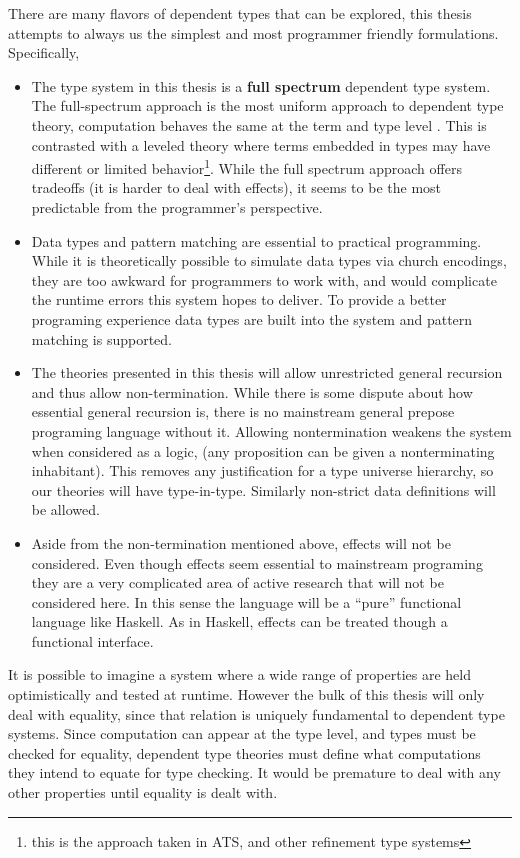 There are many flavors of dependent types that can be explored, this
thesis attempts to always us the simplest and most programmer friendly
formulations. Specifically, 
\begin{itemize}
\item The type system in this thesis is a \textbf{full spectrum} dependent
type system. The full-spectrum approach is the most uniform approach
to dependent type theory, computation behaves the same at the term
and type level \cite{10.1145/289423.289451,norell2007towards,brady2013idris,sjoberg2012irrelevance}.
This is contrasted with a leveled theory where terms embedded in types
may have different or limited behavior\footnote{this is the approach taken in ATS, and other refinement type systems}.
While the full spectrum approach offers tradeoffs (it is harder to
deal with effects), it seems to be the most predictable from the programmer's
perspective.
\item Data types and pattern matching are essential to practical programming.
While it is theoretically possible to simulate data types via church
encodings, they are too awkward for programmers to work with, and
would complicate the runtime errors this system hopes to deliver.
To provide a better programing experience data types are built into
the system and pattern matching is supported.
\item The theories presented in this thesis will allow unrestricted general
recursion and thus allow non-termination. While there is some dispute
about how essential general recursion is, there is no mainstream general prepose programing language without
it. Allowing nontermination weakens the system when considered as
a logic, (any proposition can be given a nonterminating inhabitant).
This removes any justification for a type universe hierarchy, so our
theories will have type-in-type. Similarly non-strict data definitions
will be allowed.
\item Aside from the non-termination mentioned above, effects will not be
considered. Even though effects seem essential to mainstream programing
they are a very complicated area of active research that will not
be considered here. In this sense the language will be a ``pure''
functional language like Haskell. As in Haskell, effects can be treated
though a functional interface.
\end{itemize}
It is possible to imagine a system where a wide range of properties
are held optimistically and tested at runtime. However the bulk of
this thesis will only deal with equality, since that relation is uniquely
fundamental to dependent type systems. Since computation can appear
at the type level, and types must be checked for equality, dependent
type theories must define what computations they intend to equate
for type checking. It would be premature to deal with any other properties
until equality is dealt with.

